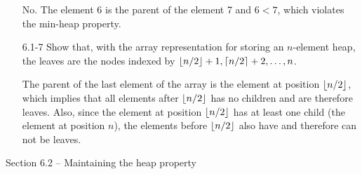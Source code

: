 \begin{enumerate}
\begin{framed}
No. The element 6 is the parent of the element 7 and $6 < 7$, which violates the
min-heap property.
\end{framed}

\item[6.1{-}7]{Show that, with the array representation for storing an
$n$-element heap, the leaves are the nodes indexed by
$\lfloor n/2\rfloor + 1, \lceil n/2\rceil + 2, \dots, n$.}

\begin{framed}
The parent of the last element of the array is the element at position
$\lfloor n/2\rfloor$, which implies that all elements after $\lfloor n/2\rfloor$ has no
children and are therefore leaves. Also, since the element at position
$\lfloor n/2\rfloor$ has at least one child (the element at position $n$), the
elements before $\lfloor n/2\rfloor$ also have and therefore can not be leaves.
\end{framed}

\end{enumerate}

\newpage

{\large Section 6.2 {--} Maintaining the heap property}

